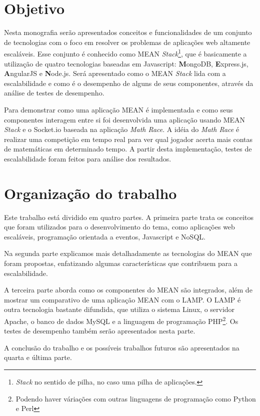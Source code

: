\section{Objetivo}

Nesta monografia serão apresentados conceitos e funcionalidades de um conjunto de tecnologias com o foco em resolver os problemas de aplicações web altamente escaláveis. Esse conjunto é conhecido como MEAN \textit{Stack}\footnote{\textit{Stack} no sentido de pilha, no caso uma pilha de aplicações.}, que é basicamente a utilização de quatro tecnologias baseadas em Javascript: \textbf{M}ongoDB, \textbf{E}xpress.js, \textbf{A}ngularJS e \textbf{N}ode.js. Será apresentado como o MEAN \textit{Stack} lida com a escalabilidade e como é o desempenho de alguns de seus componentes, através da análise de testes de desempenho.

Para demonstrar como uma aplicação MEAN é implementada e como seus componentes interagem entre si foi desenvolvida uma aplicação usando MEAN \textit{Stack} e o Socket.io  baseada na aplicação \textit{Math Race}. A idéia do \textit{Math Race} é realizar uma competição em tempo real para ver qual jogador acerta mais contas de matemáticas em determinado tempo. A partir desta implementação, testes de escalabilidade foram feitos para análise dos resultados.

\section{Organização do trabalho}

Este trabalho está dividido em quatro partes. A primeira parte trata os conceitos que foram utilizados para o desenvolvimento do tema, como aplicações web escaláveis, programação orientada a eventos, Javascript e NoSQL. 

Na segunda parte explicamos mais detalhadamente as tecnologias do MEAN que foram propostas, enfatizando algumas características que contribuem para a escalabilidade.

A terceira parte aborda como os componentes do MEAN são integrados, além de  mostrar um comparativo de uma aplicação MEAN com o LAMP. O LAMP é outra tecnologia bastante difundida, que utiliza o sistema Linux, o servidor Apache, o banco de dados MySQL e a linguagem de programação PHP\footnote{Podendo haver váriações com outras linguagens de programação como Python e Perl}. Os testes de desempenho também serão apresentados nesta parte.

A conclusão do trabalho e os possíveis trabalhos futuros são apresentados na quarta e última parte.